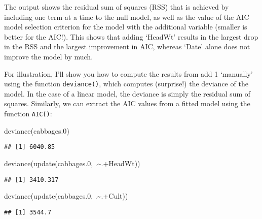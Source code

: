 \documentclass[
]{article}
\newenvironment{Shaded}{\begin{snugshade}}{\end{snugshade}}
\newcommand{\FloatTok}[1]{\textcolor[rgb]{0.00,0.00,0.81}{#1}}
\newcommand{\FunctionTok}[1]{\textcolor[rgb]{0.00,0.00,0.00}{#1}}
\newcommand{\NormalTok}[1]{#1}
\newcommand{\SpecialCharTok}[1]{\textcolor[rgb]{0.00,0.00,0.00}{#1}}
\begin{document}
The output shows the residual sum of squares (RSS) that is achieved by
including one term at a time to the null model, as well as the value of
the AIC model selection criterion for the model with the additional
variable (smaller is better for the AIC!). This shows that adding
`HeadWt' results in the largest drop in the RSS and the largest
improvement in AIC, whereas `Date' alone does not improve the model by
much.

For illustration, I'll show you how to compute the results from add 1
`manually' using the function \texttt{deviance()}, which computes
(surprise!) the deviance of the model. In the case of a linear model,
the deviance is simply the residual sum of squares. Similarly, we can
extract the AIC values from a fitted model using the function
\texttt{AIC()}:

\begin{Shaded}
\begin{Highlighting}[]
\FunctionTok{deviance}\NormalTok{(cabbages}\FloatTok{.0}\NormalTok{)}
\end{Highlighting}
\end{Shaded}

\begin{verbatim}
## [1] 6040.85
\end{verbatim}

\begin{Shaded}
\begin{Highlighting}[]
\FunctionTok{deviance}\NormalTok{(}\FunctionTok{update}\NormalTok{(cabbages}\FloatTok{.0}\NormalTok{, .}\SpecialCharTok{\textasciitilde{}}\NormalTok{.}\SpecialCharTok{+}\NormalTok{HeadWt))}
\end{Highlighting}
\end{Shaded}

\begin{verbatim}
## [1] 3410.317
\end{verbatim}

\begin{Shaded}
\begin{Highlighting}[]
\FunctionTok{deviance}\NormalTok{(}\FunctionTok{update}\NormalTok{(cabbages}\FloatTok{.0}\NormalTok{, .}\SpecialCharTok{\textasciitilde{}}\NormalTok{.}\SpecialCharTok{+}\NormalTok{Cult))}
\end{Highlighting}
\end{Shaded}

\begin{verbatim}
## [1] 3544.7
\end{verbatim}
\end{document}
